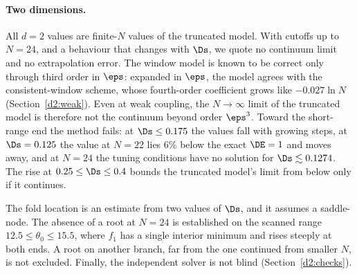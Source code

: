 \paragraph{Two dimensions.}\label{d2:caveats}
All $d=2$ values are finite-$N$ values of the truncated model. With cutoffs up to $N=24$, and a behaviour that changes
with $\Ds$, we quote no continuum limit and no extrapolation error. The window model is known to be correct only
through third order in $\eps$: expanded in $\eps$, the model agrees with the consistent-window scheme, whose
fourth-order coefficient grows like $-0.027\ln N$ (Section~\ref{d2:weak}). Even at weak coupling, the $N\to\infty$
limit of the truncated model is therefore not the continuum beyond order $\eps^3$. Toward the short-range end the
method fails: at $\Ds\le0.175$ the values fall with growing steps, at $\Ds=0.125$ the value at $N=22$ lies $6\%$ below
the exact $\DE=1$ and moves away, and at $N=24$ the tuning conditions have no solution for $\Ds\lesssim0.1274$. The rise
at $0.25\le\Ds\le0.4$ bounds the truncated model's limit from below only if it continues.

The fold location is an estimate from two values of $\Ds$, and it assumes a saddle-node. The absence of a root at
$N=24$ is established on the scanned range $12.5\le\theta_0\le15.5$, where $f_1$ has a single interior minimum and rises
steeply at both ends. A root on another branch, far from the one continued from smaller $N$, is not excluded. Finally,
the independent solver is not blind (Section~\ref{d2:checks}).

